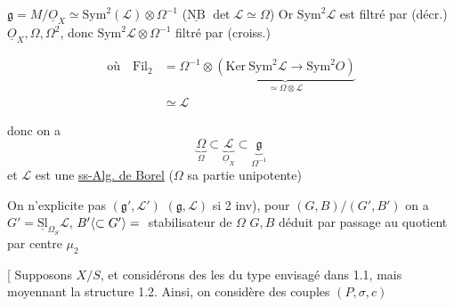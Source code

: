 
$\mathfrak g=M/\underline O_X\simeq\mathrm{Sym}^2(\mathscr L)\otimes\Omega^{-1}$ ($\underline{\mathrm{NB}}$ $\det\mathscr L\simeq\Omega$) Or $\mathrm{Sym}^2\mathscr L$ est filtré par (décr.) $\underline O_X,\Omega,\Omega^2$, donc $\mathrm{Sym}^2\mathscr L\otimes\Omega^{-1}$ filtré par (croiss.)



\[ \begin{aligned}
 \text{où}\quad \mathrm{Fil}_2&=\Omega^{-1}\otimes\underbrace{(\mathrm{Ker}\ \mathrm{Sym}^2\mathscr L\longrightarrow\mathrm{Sym}^2 O)}_{\simeq\Omega\otimes\mathscr L}\\
 &\simeq\mathscr L
 \end{aligned} \]

donc on a
\[ \underset{\Omega}{\underbrace{\Omega}}\subset\underset{\underline O_X}{\underbrace{\mathscr L}}\subset\underset{\Omega^{-1}}{\underbrace{\mathfrak g}} \]
et $\mathscr L$ est une \uline{ss-Alg. de Borel} ($\Omega$ sa partie unipotente)


On n'explicite pas $(\mathfrak g',\mathscr L')$  $(\mathfrak g,\mathscr L)$ si 2 inv), pour $(G,B)/(G',B')$ on a $G'=\underline{\mathrm{Sl}}_{\Omega_S}\mathscr L$, $B'\inserted{\subset G'}={}$ stabilisateur de $\Omega$ $G,B$ déduit par passage au quotient par centre $\mu_2$

[ \uline{} Supposons $X/S$, et considérons des  les  du type envisagé dans 1.1, mais moyennant  la structure 1.2. Ainsi, on considère des couples $(P,\sigma,c)$

